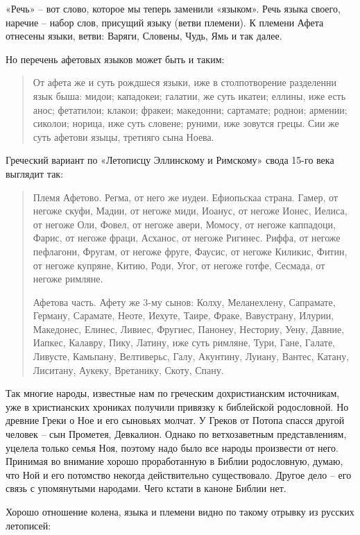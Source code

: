 «Речь» – вот слово, которое мы теперь заменили «языком». Речь языка своего, наречие – набор слов, присущий языку (ветви племени). К племени Афета отнесены языки, ветви: Варяги, Словены, Чудь, Ямь и так далее.

Но перечень афетовых языков может быть и таким:

\begin{quotation}
От афета же и суть рождшеся языки, иже в столпотворение разделенни язык быша: мидои; кападокеи; галатии, же суть икатеи; еллины, иже есть анос; фетатилои; клакои; фракеи; македонни; сартамате; роднои; армении; сиколои; норица, иже суть словене; руними, иже зовутся грецы. Сии же суть афетови языцы, третияго сына Ноева.
\end{quotation}

Греческий вариант по «Летописцу Эллинскому и Римскому» свода 15-го века выглядит так: 

\begin{quotation}
Племя Афетово. Регма, от него же иудеи. Ефиопьскаа страна. Гамер, от негоже скуфи, Мадии, от негоже миди, Иоанус, от негоже Ионес, Иелиса, от негоже Оли, Фовел, от негоже авери, Момосу, от негоже каппадоци, Фарис, от негоже фраци, Асханос, от негоже Ригинес. Риффа, от негоже пефлагони, Фругам, от негоже фруге, Фаусис, от негоже Киликис, Фитин, от негоже купряне, Китию, Роди, Угог, от негоже готфе, Сесмада, от негоже римляне.

Афетова часть. Афету же 3-му сынов: Колху, Меланехлену, Сапрамате, Герману, Сарамате, Неоте, Иехуте, Таире, Фраке, Вавустрану, Илурии, Македонес, Елинес, Ливиес, Фругиес, Панонеу, Несториу, Уену, Давние, Иапкес, Калавру, Пику, Латину, иже суть римляне, Тури, Гане, Галате, Ливусте, Камьпану, Велтиверьс, Галу, Акунтину, Луиану, Вантес, Катану, Лиситану, Аукеку, Вретанику, Скоту, Спану.
\end{quotation}

Так многие народы, известные нам по греческим дохристианским источникам, уже в христианских хрониках получили привязку к библейской родословной. Но древние Греки о Ное и его сыновьях молчат. У Греков от Потопа спасся другой человек – сын Прометея, Девкалион. Однако по ветхозаветным представлениям, уцелела только семья Ноя, поэтому надо было все народы произвести от него. Принимая во внимание хорошо проработанную в Библии родословную, думаю, что Ной и его потомство некогда действительно существовало. Другое дело – его связь с упомянутыми народами. Чего кстати в каноне Библии нет.

Хорошо отношение колена, языка и племени видно по такому отрывку из русских летописей:

